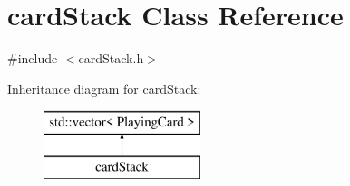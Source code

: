 \hypertarget{classcardStack}{\section{card\-Stack Class Reference}
\label{classcardStack}
}


{\ttfamily \#include $<$card\-Stack.\-h$>$}

Inheritance diagram for card\-Stack\-:\begin{figure}[H]
\begin{center}
\leavevmode
\includegraphics[height=2.000000cm]{classcardStack}
\end{center}
\end{figure}

